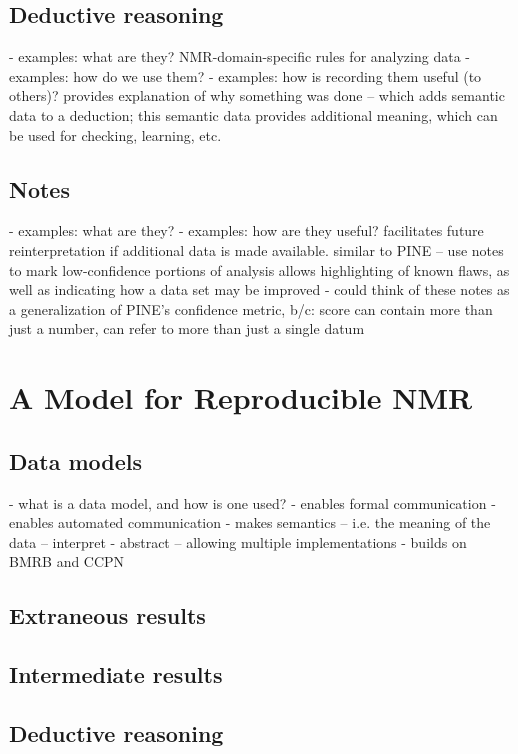 \subsection{Deductive reasoning}
 - examples: what are they?  NMR-domain-specific rules for analyzing data
 - examples: how do we use them?
 - examples: how is recording them useful (to others)?
   provides explanation of why something was done -- which adds semantic data
   to a deduction; this semantic data provides additional meaning, which can
   be used for checking, learning, etc.

\subsection{Notes}
 - examples: what are they?
 - examples: how are they useful?  facilitates future reinterpretation if
   additional data is made available.  similar to PINE -- use notes to mark
   low-confidence portions of analysis
   allows highlighting of known flaws, as well as indicating how a data set
   may be improved
 - could think of these notes as a generalization of PINE's confidence metric,
   b/c: score can contain more than just a number, can refer to more than just
   a single datum


\section{A Model for Reproducible NMR}

\subsection{Data models}
 - what is a data model, and how is one used?
 - enables formal communication
 - enables automated communication
 - makes semantics -- i.e. the meaning of the data -- interpret
 - abstract -- allowing multiple implementations
 - builds on BMRB and CCPN

\subsection{Extraneous results}

\subsection{Intermediate results}

\subsection{Deductive reasoning}

